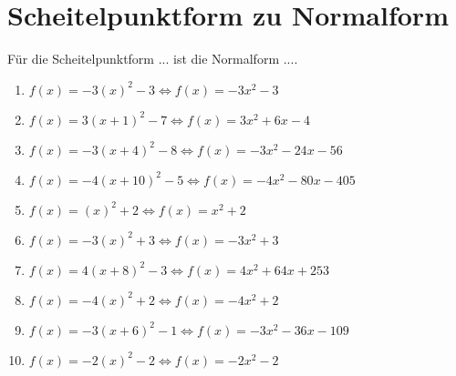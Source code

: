 \documentclass{article}%
\begin{document}
\section{Scheitelpunktform zu Normalform}%
\label{sec:ScheitelpunktformzuNormalform}%
Für die Scheitelpunktform ... ist die Normalform ....%
\begin{enumerate}[label=\alph*)]%
\item%
\newline\vspace{0.5cm}$f(x)=-3(x)^2 -3\Leftrightarrow f(x)=-3x^2 - 3$%
\item%
\newline\vspace{0.5cm}$f(x)=3(x+1)^2 -7\Leftrightarrow f(x)=3x^2 + 6x - 4$%
\item%
\newline\vspace{0.5cm}$f(x)=-3(x+4)^2 -8\Leftrightarrow f(x)=-3x^2 - 24x - 56$%
\item%
\newline\vspace{0.5cm}$f(x)=-4(x+10)^2 -5\Leftrightarrow f(x)=-4x^2 - 80x - 405$%
\item%
\newline\vspace{0.5cm}$f(x)=(x)^2 +2\Leftrightarrow f(x)=x^2 + 2$%
\item%
\newline\vspace{0.5cm}$f(x)=-3(x)^2 +3\Leftrightarrow f(x)=-3x^2 + 3$%
\item%
\newline\vspace{0.5cm}$f(x)=4(x+8)^2 -3\Leftrightarrow f(x)=4x^2 + 64x + 253$%
\item%
\newline\vspace{0.5cm}$f(x)=-4(x)^2 +2\Leftrightarrow f(x)=-4x^2 + 2$%
\item%
\newline\vspace{0.5cm}$f(x)=-3(x+6)^2 -1\Leftrightarrow f(x)=-3x^2 - 36x - 109$%
\item%
\newline\vspace{0.5cm}$f(x)=-2(x)^2 -2\Leftrightarrow f(x)=-2x^2 - 2$%
\end{enumerate}

%
\end{document}
